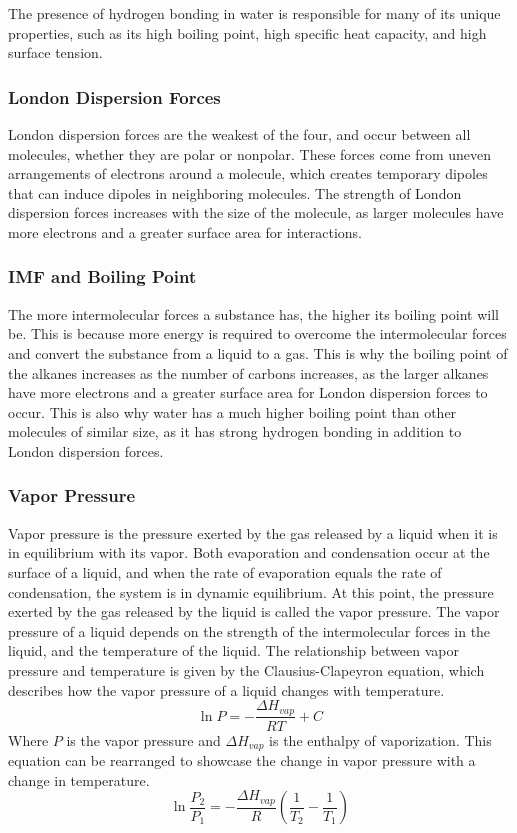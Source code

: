 The presence of hydrogen bonding in water is responsible for many of its unique properties, such as its high boiling point, high specific heat capacity, and high surface tension. 
\subsubsection{London Dispersion Forces}
London dispersion forces are the weakest of the four, and occur between all molecules, whether they are polar or nonpolar. These forces come from uneven arrangements of electrons around a molecule, which creates temporary dipoles that can induce dipoles in neighboring molecules. The strength of London dispersion forces increases with the size of the molecule, as larger molecules have more electrons and a greater surface area for interactions.
\subsubsection{IMF and Boiling Point}
The more intermolecular forces a substance has, the higher its boiling point will be. This is because more energy is required to overcome the intermolecular forces and convert the substance from a liquid to a gas. This is why the boiling point of the alkanes increases as the number of carbons increases, as the larger alkanes have more electrons and a greater surface area for London dispersion forces to occur. This is also why water has a much higher boiling point than other molecules of similar size, as it has strong hydrogen bonding in addition to London dispersion forces.
\subsubsection{Vapor Pressure}
Vapor pressure is the pressure exerted by the gas released by a liquid when it is in equilibrium with its vapor. Both evaporation and condensation occur at the surface of a liquid, and when the rate of evaporation equals the rate of condensation, the system is in dynamic equilibrium. At this point, the pressure exerted by the gas released by the liquid is called the vapor pressure. The vapor pressure of a liquid depends on the strength of the intermolecular forces in the liquid, and the temperature of the liquid. The relationship between vapor pressure and temperature is given by the Clausius-Clapeyron equation, which describes how the vapor pressure of a liquid changes with temperature.
\begin{equation}\label{eq:clausius}
    \ln P = -\frac{\Delta H_{vap}}{RT} + C
\end{equation}
Where $P$ is the vapor pressure and $\Delta H_{vap}$ is the enthalpy of vaporization.
This equation can be rearranged to showcase the change in vapor pressure with a change in temperature.
\begin{equation}\label{eq:clausius_rearranged}
    \ln \frac{P_2}{P_1} = -\frac{\Delta H_{vap}}{R}\left(\frac{1}{T_2} - \frac{1}{T_1}\right)
\end{equation}

